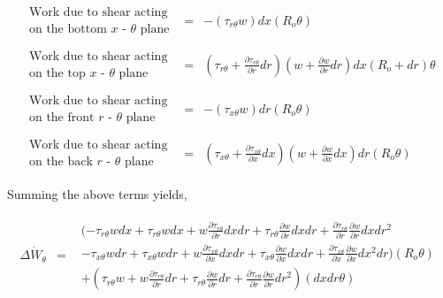 \begin{displaymath}
       \begin{array}{ccc}
	\begin{array}{c}
		\textrm{Work due to shear acting} \\ \textrm{on the bottom $x$ - $\theta$ plane}
	\end{array} & = &
	-(\tau_{r\theta}w)dx(R_o \theta)
	\\ & & \\
	\begin{array}{c}
		\textrm{Work due to shear acting} \\ \textrm{on the top $x$ - $\theta$ plane}
	\end{array} & = &
	(\tau_{r \theta} + \frac{\partial \tau_{r \theta}}{\partial r}dr)(w + \frac{\partial w}{\partial r}dr)
	dx(R_o + dr) \theta
	\\ & & \\
	\begin{array}{c}
		\textrm{Work due to shear acting} \\ \textrm{on the front $r$ - $\theta$ plane}
	\end{array} & = &
	-(\tau_{x \theta}w)dr(R_o \theta)
	\\ & & \\
	\begin{array}{c}
		\textrm{Work due to shear acting} \\ \textrm{on the back $r$ - $\theta$ plane}
	\end{array} & = &
	(\tau_{x \theta} + \frac{\partial \tau_{x \theta}}{\partial x}dx)(w + \frac{\partial w}{\partial x}dx)
	dr (R_o \theta)
       \end{array}
\end{displaymath}

	Summing the above terms yields,

\begin{displaymath}
	\begin{array}{ccc}
		\Delta \dot{W}_\theta & = &
		\begin{array}{c}
		(-\tau_{r \theta}w dx  + \tau_{r \theta}w dx + w\frac{\partial \tau_{r \theta}}{\partial r}dxdr
		+\tau_{r \theta}\frac{\partial w}{\partial r}dxdr + \frac{\partial \tau_{r \theta}}{\partial r}
		\frac{\partial w}{\partial r}dxdr^2 \\
		-\tau_{x \theta}w dr + \tau_{x \theta} w dr + w\frac{\partial \tau_{x \theta}}{\partial x}dxdr
		+\tau_{x \theta}\frac{\partial w}{\partial x}dxdr + \frac{\partial \tau_{x \theta}}{\partial x}
		\frac{\partial w}{\partial x}dx^2dr)(R_o \theta) \\
		+(\tau_{r \theta}w + w\frac{\partial \tau_{r \theta}}{\partial r}dr
		+\tau_{r \theta}\frac{\partial w}{\partial r}dr + \frac{\partial \tau_{r \theta}}{\partial r}
		\frac{\partial w}{\partial r}dr^2)(dxdr\theta)
		\end{array}
	\end{array}
\end{displaymath}

